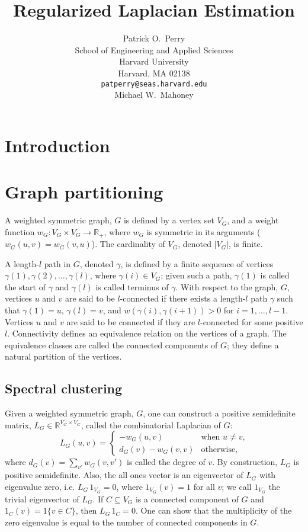 \documentclass[12pt]{article}
\title{
  Regularized Laplacian Estimation
}
\author{
  Patrick O.~Perry \\
  School of Engineering and Applied Sciences \\
  Harvard University \\
  Harvard, MA 02138 \\
  \texttt{patperry@seas.harvard.edu} \\
  \And
  Michael W.\ Mahoney
}
\newcommand{\reals}{\mathbb{R}}
\theoremstyle{plain}
\begin{document}
\maketitle

\begin{abstract}
\end{abstract}

\section{Introduction}

\section{Graph partitioning}
\label{S:introduction}

A weighted symmetric graph, $G$ is defined by a vertex set $V_G$, and a
weight function $w_G : V_G \times V_G \to \reals_+$, where $w_G$ is symmetric
in its arguments ($w_G(u,v) = w_G(v,u)$).  The cardinality of $V_G$,
denoted $|V_G|$, is finite.

A length-$l$ path in $G$, denoted $\gamma$, is defined by a finite sequence of
vertices $\gamma(1), \gamma(2), \ldots, \gamma(l)$, where $\gamma(i) \in V_G$; given
such a path, $\gamma(1)$ is called the start of $\gamma$ and 
$\gamma(l)$ is called terminus of $\gamma$.  With respect to
the graph, $G$, vertices $u$ and $v$ are said to be $l$-connected if there
exists a length-$l$ path $\gamma$ such that $\gamma(1) = u$,
$\gamma(l) = v$, and $w(\gamma(i), \gamma(i+1)) > 0$ for $i = 1,
\ldots, l-1$.  Vertices $u$ and $v$ are said to be connected if they
are $l$-connected for some positive $l$.  Connectivity defines an
equivalence relation on the vertices of a graph.  The equivalence
classes are called the connected components of $G$; they define a
natural partition of the vertices.

\subsection{Spectral clustering}

Given a weighted symmetric graph, $G$, one can construct a positive
semidefinite matrix, $L_G \in \reals^{V_G \times V_G}$, called the combinatorial Laplacian of $G$:
\[
  L_G(u,v)
  =
  \begin{cases}
    - w_G(u,v) & \text{when $u \neq v$,} \\
    d_G(v) - w_G(v,v) & \text{otherwise,}
  \end{cases}
\]
where $d_G(v) = \sum_{v'} w_G(v,v')$ is called the degree of $v$.
By construction, $L_G$ is positive semidefinite.  Also, the all ones
vector is an eigenvector of $L_G$ with eigenvalue zero, i.e. $L_G \, 1_{V_G}
= 0$, where $1_{V_G}(v) = 1$ for all $v$; we call $1_{V_G}$ the
trivial eigenvector of $L_G$.  If $C \subseteq V_G$ is a connected component of
$G$ and $1_C(v) = 1\{ v \in C \}$, then $L_G \, 1_C = 0$.  One can
show that the multiplicity of the zero eigenvalue is equal to the
number of connected components in $G$.
\end{document}
